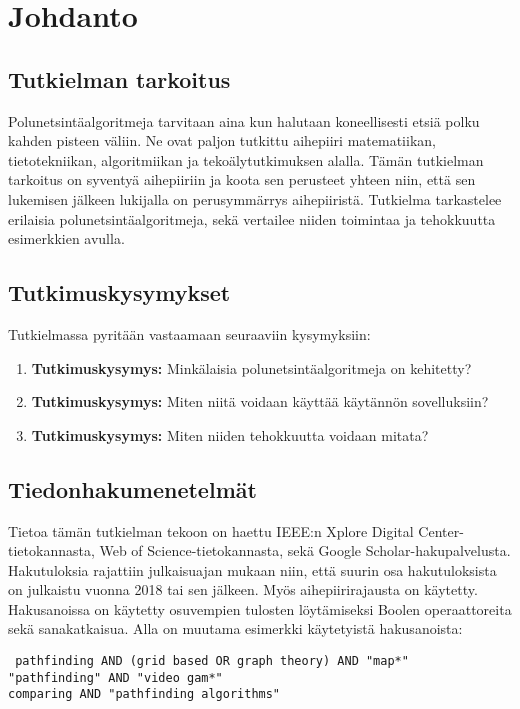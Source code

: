 \chapter{Johdanto} \label{Johdanto}

\section{Tutkielman tarkoitus}\label{tTarkoitus}
Polunetsintäalgoritmeja tarvitaan aina kun halutaan koneellisesti etsiä 
polku kahden pisteen väliin. Ne ovat paljon tutkittu aihepiiri matematiikan, 
tietotekniikan, algoritmiikan ja tekoälytutkimuksen alalla. Tämän tutkielman 
tarkoitus on syventyä aihepiiriin ja koota sen perusteet yhteen niin, että sen 
lukemisen jälkeen lukijalla on perusymmärrys aihepiiristä. Tutkielma 
tarkastelee erilaisia polunetsintäalgoritmeja, sekä vertailee niiden 
toimintaa ja tehokkuutta esimerkkien avulla.

\section{Tutkimuskysymykset}\label{tutkimuskysymykset}
Tutkielmassa pyritään vastaamaan seuraaviin kysymyksiin:
\begin{enumerate}[label=\textbf{\arabic*.}]
	\item \label{tKysymys1} \textbf{Tutkimuskysymys:} Minkälaisia polunetsintäalgoritmeja on kehitetty?
	\item \label{tKysymys2} \textbf{Tutkimuskysymys:} Miten niitä voidaan käyttää käytännön sovelluksiin?
	\item \label{tKysymys3} \textbf{Tutkimuskysymys:} Miten niiden tehokkuutta voidaan mitata?
\end{enumerate}

\section{Tiedonhakumenetelmät}\label{tiedonhakuM}
Tietoa tämän tutkielman tekoon on haettu IEEE:n Xplore Digital 
Center-tietokannasta, Web of Science-tietokannasta, sekä Google 
Scholar-hakupalvelusta. Hakutuloksia rajattiin julkaisuajan mukaan niin, 
että suurin osa hakutuloksista on julkaistu vuonna 2018 tai sen jälkeen. 
Myös aihepiirirajausta on käytetty. Hakusanoissa on käytetty osuvempien 
tulosten löytämiseksi Boolen operaattoreita sekä sanakatkaisua. Alla on 
muutama esimerkki käytetyistä hakusanoista:
\begin{center}
\texttt{
	pathfinding AND (grid based OR graph theory) AND "map*"	\\
	"pathfinding" AND "video gam*"				\\
	comparing AND "pathfinding algorithms"			\\
}
\end{center}

